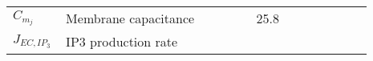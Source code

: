 \documentclass[fleqn]{report}
\numberwithin{equation}{section}
\numberwithin{equation}{section}
\newcommand{\NO}{\text{NO}}
\newcommand{\eNOSact}{\text{eNOS$_{\text{act}}$}}
\newcommand{\LArg}{\text{L-Arg}}
\newcommand{\Otwo}{\text{O$_2$}}
\newcommand{\Ca}{\text{Ca$^{2+}$}}
\newcommand{\NOj}{\text{[NO]$_j$}}
\newcommand{\uMpers}{\textmu M\,s$^{-1}$}
\newcommand\pNO[1]{\text{$p_{\text{NO},#1}$}}
\newcommand\cNO[1]{\text{$c_{\text{NO},#1}$}}
\newcommand\dNO[1]{\text{$d_{\text{NO},#1}$}}
\begin{document}
 			\begin{table}[h!]
 			\centering
 			\begin{tabular}{ p{0.09\linewidth}  >{\footnotesize} p{0.5\linewidth}  >{\footnotesize} p{0.27\linewidth} >{\footnotesize} p{0.03\linewidth} }
 			\hline
 			 $C_{m_{j}}$				& Membrane capacitance												& 25.8  \pF		& \cite{Koenigsberger2006} \\
 			 $ J_{EC,IP_3} $  & \gls{IP3} production rate & \uMps & \cite{Koenigsberger2006}  \\
 			\hline
 			\end{tabular}
 			\label{tab:JSRuptakei}
 			\end{table}
% 								
% 						
% 						
% 		
\end{document}
